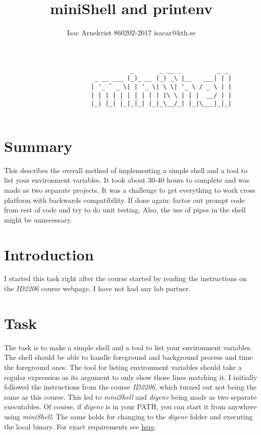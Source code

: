 \documentclass{article}
\author{Isac Arnekvist 860202-2017 isacar@kth.se}
\title{miniShell and printenv}
\begin{document}
\maketitle
\begin{verbatim}
                                   _       _ __ _          _ _ 
                         _ __ ___ (_)_ __ (_) _\ |__   ___| | |
                        | '_ ` _ \| | '_ \| \ \| '_ \ / _ \ | |
                        | | | | | | | | | | |\ \ | | |  __/ | |
                        |_| |_| |_|_|_| |_|_\__/_| |_|\___|_|_|
                                                               
\end{verbatim}
\section*{Summary}
    This describes the overall method of implementing a simple shell and a tool
    to list your environment variables. It took about 30-40 hours to complete
    and was made as two separate projects. It was a challenge to get everything
    to work cross platform with backwards compatibility. If done again: factor
    out prompt code from rest of code and try to do unit testing. Also, the use
    of pipes in the shell might be unnecessary.

\newpage
{}
\section{Introduction}
    I started this task right after the course started by reading the instructions
    on the \emph{ID2206} course webpage. I have not had any lab partner.
    
\section{Task}
    The task is to make a simple shell and a tool to list your environment
    variables. The shell should be able to handle foreground and background
    process and time the foreground ones. The tool for listing environment
    variables should take a regular expression as its argument to only show
    those lines matching it.  I initially followed the instructions from the
    course \emph{ID2206}, which turned out not being the same as this course.
    This led to \emph{miniShell} and \emph{digenv} being made as two separate
    executables. Of course, if \emph{digenv} is in your PATH, you can start it
    from anywhere using \emph{miniShell}. The same holds for changing to the
    \emph{digenv} folder and executing the local binary. For exact requirements
    see
    \href{https://www.kth.se/social/course/ID2200/page/laborations-pm/}{here}.
\end{document}
